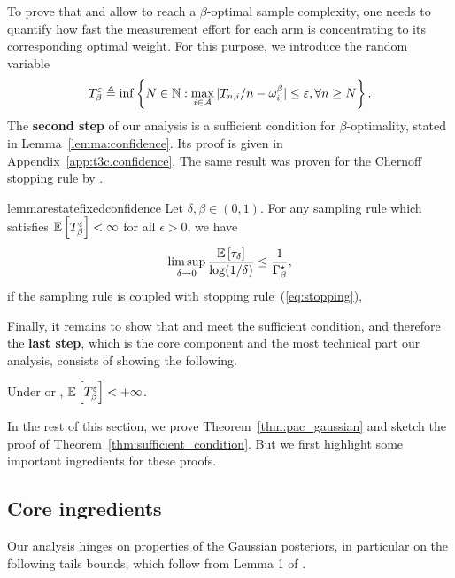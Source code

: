 To prove that \TTTS and \TCC allow to reach a $\beta$-optimal sample complexity, one needs to quantify how fast the measurement effort for each arm is concentrating to its corresponding optimal weight. For this purpose,  we introduce the random variable
\[
    T_{\beta}^\varepsilon \triangleq \inf \left\{ N\in{\mathbb N}: \max_{i\in\mathcal{A}} \vert T_{n,i}/n-\omega_i^\beta \vert \leq \varepsilon, \forall n \geq N \right\}.
\]
The \textbf{second step} of our analysis is a sufficient condition for $\beta$-optimality, stated in Lemma~\ref{lemma:confidence}. Its proof is given in Appendix~\ref{app:t3c.confidence}. The same result was proven for the Chernoff stopping rule by \cite{qin2017ttei}.

\begin{restatable}{lemma}{restatefixedconfidence}\label{lemma:confidence}
    Let $\delta,\beta\in (0,1)$. For any sampling rule which satisfies $\mathbb{E}\left[T_{\beta}^\varepsilon\right] < \infty$ for all $\epsilon > 0$, we have
    \[
        \limsup_{\delta\rightarrow{0}} \frac{\mathbb{E}\left[\tau_{\delta}\right]}{\log(1/\delta)} \leq \frac{1}{\Gamma_{\beta}^\star},
    \]
    if the sampling rule is coupled with stopping rule~(\ref{eq:stopping}), 
\end{restatable}

Finally, it remains to show that \TTTS and \TCC meet the sufficient condition, and therefore the \textbf{last step}, which is the core component and the most technical part our analysis, consists of showing the following.

\begin{theorem}\label{thm:sufficient_condition}
    Under \TTTS or \TCC, $\mathbb{E}\left[T_{\beta}^\varepsilon\right] < +\infty$.
\end{theorem}


In the rest of this section, we prove Theorem~\ref{thm:pac_gaussian} and sketch the proof of Theorem~\ref{thm:sufficient_condition}. But we first highlight some important ingredients for these proofs.

\subsection{Core ingredients}

Our analysis hinges on properties of the Gaussian posteriors, in particular on the following tails bounds, which follow from Lemma 1 of \cite{qin2017ttei}.

